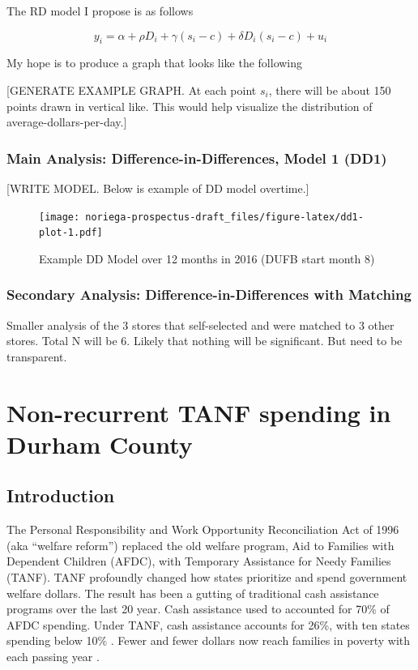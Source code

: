\documentclass[12pt,letterpaperpaper,]{book}
\begin{document}
The RD model I propose is as follows

\[
y_{i} = \alpha + \rho D_i + \gamma (s_i - c) + \delta D_i(s_i - c) + u_{i}
\]

My hope is to produce a graph that looks like the following

{[}GENERATE EXAMPLE GRAPH. At each point \(s_i\), there will be about
150 points drawn in vertical like. This would help visualize the
distribution of average-dollars-per-day.{]}

\subsection{Main Analysis: Difference-in-Differences, Model 1
(DD1)}\label{main-analysis-difference-in-differences-model-1-dd1}

{[}WRITE MODEL. Below is example of DD model overtime.{]}

\begin{figure}
\centering
\texttt{[image: noriega-prospectus-draft\_files/figure-latex/dd1-plot-1.pdf]}
\caption{\label{fig:dd1-plot}Example DD Model over 12 months in 2016 (DUFB
start month 8)}
\end{figure}

\subsection*{Secondary Analysis: Difference-in-Differences with
Matching}\label{secondary-analysis-difference-in-differences-with-matching}

Smaller analysis of the 3 stores that self-selected and were matched to
3 other stores. Total N will be 6. Likely that nothing will be
significant. But need to be transparent.

\chapter{Non-recurrent TANF spending in Durham County}\label{chapter-2}

\section*{Introduction}\label{intro-2}

The Personal Responsibility and Work Opportunity Reconciliation Act of
1996 (aka ``welfare reform'') replaced the old welfare program, Aid to
Families with Dependent Children (AFDC), with Temporary Assistance for
Needy Families (TANF). TANF profoundly changed how states prioritize and
spend government welfare dollars. The result has been a gutting of
traditional cash assistance programs over the last 20 year. Cash
assistance used to accounted for 70\% of AFDC spending. Under TANF, cash
assistance accounts for 26\%, with ten states spending below 10\%
\citep{schott_how_2015}. Fewer and fewer dollars now reach families in
poverty with each passing year \citep{cbpp_chart_2016}.
\end{document}
